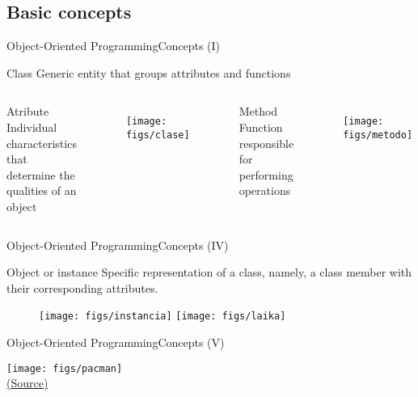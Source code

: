 \documentclass[10pt,compress]{beamer} %
\begin{document}
\subsection{Basic concepts}

\begin{frame}{Object-Oriented Programming}{Concepts (I)}
	\begin{block}{Class}
		 Generic entity that groups attributes and functions
  	\end{block}	


    \begin{columns}[t]

	    \begin{block}{Atribute}
		Individual characteristics that determine the qualities of an object
  	    \end{block}	

		\begin{figure}
			\texttt{[image: figs/clase]}	
		\end{figure}				


	    \begin{block}{Method}
		 Function responsible for performing operations
  	    \end{block}	
		\begin{figure}
			\texttt{[image: figs/metodo]}
		\end{figure}				
   \end{columns}
\end{frame}

\begin{frame}{Object-Oriented Programming}{Concepts (IV)}
	\vfill\begin{block}{Object or instance}
		 Specific representation of a class, namely, a class member with their corresponding attributes.
  	\end{block}	  	
		\begin{figure}
			\texttt{[image: figs/instancia]}\hfill
			\texttt{[image: figs/laika]}
		\end{figure}				
\end{frame}

\begin{frame}[plain]{Object-Oriented Programming}{Concepts (V)}
	\begin{center}
	\texttt{[image: figs/pacman]}\\
	\smallskip
	\tiny{\href{http://blog.sklambert.com/introduction-to-oop-for-game-development/}{(Source)}}
	\end{center}
\end{frame}
\end{document}
